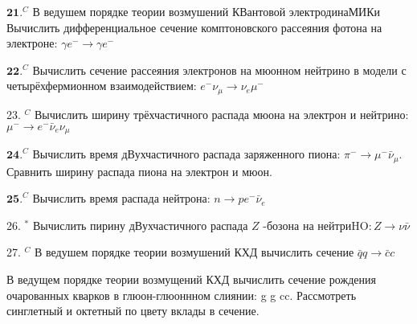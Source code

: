 \documentclass[a4paper,12pt]{article} %
\begin{document}
\begin{ttask}

$\mathbf{2 1 .}^{C}$ В ведушем порядке теории возмушений КВантовой электродинаМИКи Вычислить дифференциальное сечение комптоновского рассеяния фотона на электроне: $\gamma e^{-} \rightarrow \gamma e^{-}$


\end{ttask}



\begin{ttask}

$\mathbf{2 2 .}^{C}$ Вычислить сечение рассеяния электронов на мюонном нейтрино
в модели с четырёхфермионном взаимодействием: $e^{-} \nu_{\mu} \rightarrow \nu_{e} \mu^{-}$


\end{ttask}



\begin{ttask}

23. $^{C}$ Вычислить ширину трёхчастичного распада мюона на электрон и нейтрино: $\mu^{-} \rightarrow e^{-} \bar{\nu}_{e} \nu_{\mu}$


\end{ttask}



\begin{ttask}

$\mathbf{2 4 .}^{C}$ Вычислить время дВухчастичного распада заряженного пиона:
$\pi^{-} \rightarrow \mu^{-} \bar{\nu}_{\mu} .$ Сравнить ширину распада пиона на электрон и мюон.



\end{ttask}



\begin{ttask}

$\mathbf{2 5 .}^{C}$ Вычислить время распада нейтрона: $n \rightarrow p e^{-} \bar{\nu}_{e}$


\end{ttask}



\begin{ttask}

26. $^{*}$ Вычислить пирину дВухчастичного распада $Z$ -бозона на нейтри$\mathrm{HO}: Z \rightarrow \nu \bar{\nu}$


\end{ttask}



\begin{ttask}

27. $^{C}$ В ведушем порядке теории возмушений КХД вычислить сечение
$\bar{q} q \rightarrow \bar{c} c$


\end{ttask}



\begin{ttask}

В ведущем порядке теории возмущений КХД вычислить сечение рождения очарованных кварков в глюон-глюоннном слиянии: g g  cc. Рассмотреть синглетный и октетный по цвету вклады в сечение. 


\end{ttask}




\printindex



\end{document}
